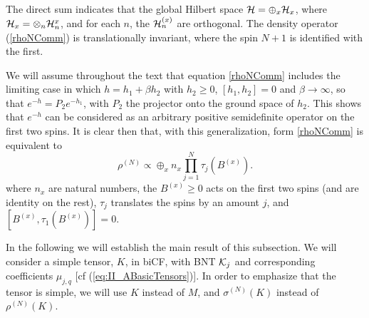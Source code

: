 \documentclass{elsarticle}
\newcommand{\be}{\begin{equation}}
\newcommand{\ee}{\end{equation}}
\begin{document}
The direct sum indicates that the global Hilbert space ${\cal H}= \oplus_x {\cal H}_x$, where
${\cal H}_x=\otimes_n {\cal H}_n^{x}$, and for each $n$, the ${\cal H}_n^{(x)}$ are orthogonal. The density operator (\ref{rhoNComm}) is translationally invariant, where the spin $N+1$ is identified with the first.

We will assume throughout the text that equation \eqref{rhoNComm} includes the limiting case in which $h=h_1+\beta h_2$ with $h_2\ge 0$, $[h_1,h_2]=0$ and $\beta\rightarrow \infty$, so that $e^{-h}=P_2e^{-h_1}$, with $P_2$ the projector onto the ground space of $h_2$. This shows that $e^{-h}$ can be considered  as an arbitrary positive semidefinite operator on the first two spins. It is clear then that, with this generalization, form \eqref{rhoNComm} is equivalent to
\be
    \label{rhoNCommv2}
    \rho^{(N)}\propto \oplus_{x} n_x \prod_{j=1}^N \tau_{j}(B^{(x)}).
\ee
where $n_x$ are natural numbers, the $B^{(x)}\ge 0$ acts on the first two spins (and are identity on the rest), $\tau_j$ translates the spins by an amount $j$, and $[B^{(x)},\tau_1(B^{(x)})]=0$.

In the following we will establish the main result of this subsection. We will consider a simple tensor, $K$, in biCF, with BNT ${\cal K}_j$ and corresponding coefficients $\mu_{j,q}$ [cf (\ref{eq:II_ABasicTensors})]. In order to emphasize that the tensor is simple, we will use $K$ instead of $M$, and $\sigma^{(N)}(K)$ instead of $\rho^{(N)}(K)$.
\end{document}
